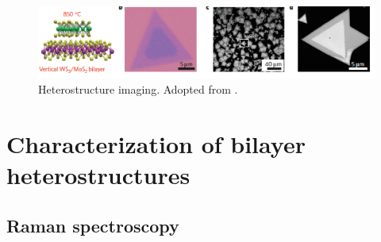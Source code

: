 \begin{figure}[H]
	\begin{center}
		\includegraphics[scale=1]{Heterostructures/HeterostructureOpticalSEMAFMImages.png}
		\caption{Heterostructure imaging. Adopted from \cite{Gong2014}.}
		\label{fig:HeterostructuresOpticalSEMAFMImages}
	\end{center}
\end{figure}

\section{Characterization of bilayer heterostructures}

\subsection{Raman spectroscopy}

